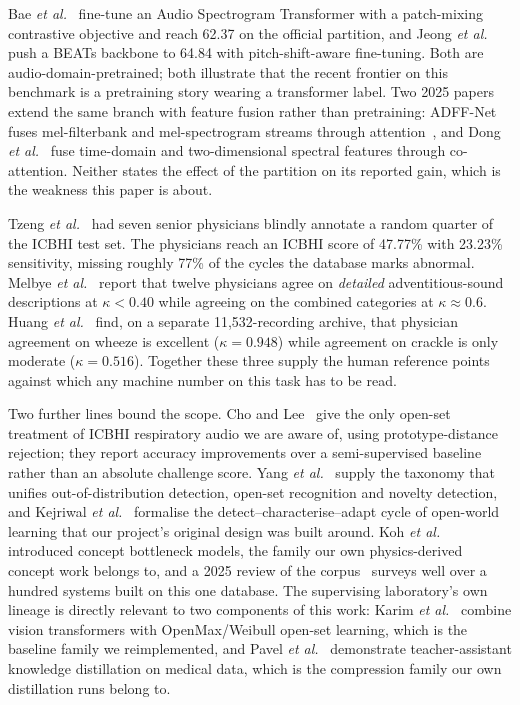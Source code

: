 \documentclass[journal,onecolumn]{IEEEtran}
\begin{document}
Bae \emph{et al.}~\cite{bae2023patchmix} fine-tune an Audio Spectrogram
Transformer with a patch-mixing contrastive objective and reach 62.37 on the
official partition, and Jeong \emph{et al.}~\cite{pafa2025} push a
BEATs backbone to 64.84 with pitch-shift-aware fine-tuning. Both are
audio-domain-pretrained; both illustrate that the recent frontier on this
benchmark is a pretraining story wearing a transformer label. Two 2025 papers
extend the same branch with feature fusion rather than pretraining: ADFF-Net
fuses mel-filterbank and mel-spectrogram streams through
attention~\cite{adffnet2025}, and Dong \emph{et al.}~\cite{bspc2025fusion} fuse
time-domain and two-dimensional spectral features through co-attention. Neither
states the effect of the partition on its reported gain, which is the weakness
this paper is about.

Tzeng \emph{et al.}~\cite{tzeng2025jmir} had seven senior physicians blindly
annotate a random quarter of the ICBHI test set. The physicians reach an ICBHI
score of 47.77\% with 23.23\% sensitivity, missing roughly 77\% of the cycles the
database marks abnormal. Melbye \emph{et al.}~\cite{melbye2016kappa} report that
twelve physicians agree on \emph{detailed} adventitious-sound descriptions at
$\kappa<0.40$ while agreeing on the combined categories at $\kappa\approx0.6$.
Huang \emph{et al.}~\cite{huang2024crackles} find, on a separate 11{,}532-recording
archive, that physician agreement on wheeze is excellent ($\kappa=0.948$) while
agreement on crackle is only moderate ($\kappa=0.516$). Together these three
supply the human reference points against which any machine number on this task
has to be read.

Two further lines bound the scope. Cho and Lee~\cite{cho2025openset} give the only
open-set treatment of ICBHI respiratory audio we are aware of, using
prototype-distance rejection; they report accuracy improvements over a
semi-supervised baseline rather than an absolute challenge score. Yang
\emph{et al.}~\cite{yang2024ood} supply the taxonomy that unifies
out-of-distribution detection, open-set recognition and novelty detection, and
Kejriwal \emph{et al.}~\cite{kejriwal2024owl} formalise the
detect--characterise--adapt cycle of open-world learning that our project's
original design was built around. Koh
\emph{et al.}~\cite{koh2020cbm} introduced concept bottleneck models, the family
our own physics-derived concept work belongs to, and a 2025 review of the
corpus~\cite{electronics2025review} surveys well over a hundred systems built on
this one database. The supervising laboratory's own lineage is directly relevant
to two components of this work: Karim \emph{et al.}~\cite{karim2024mosquito}
combine vision transformers with OpenMax/Weibull open-set learning, which is the
baseline family we reimplemented, and Pavel \emph{et al.}~\cite{pavel2024kd}
demonstrate teacher-assistant knowledge distillation on medical data, which is the
compression family our own distillation runs belong to.
\end{document}
